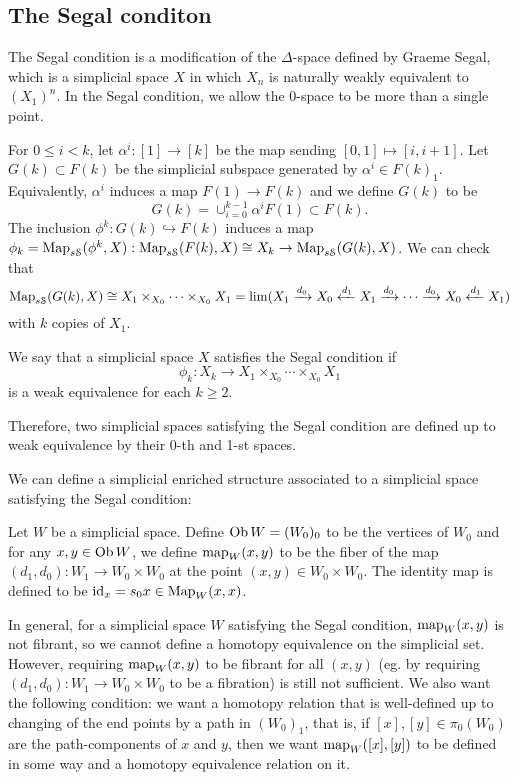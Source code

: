 \begin{refsection}
\subsection{The Segal conditon}
The Segal condition is a modification of the $\Delta$-space defined by Graeme Segal, which is a simplicial space $X$ in which $X_n$ is naturally weakly equivalent to $(X_1)^n$. In the Segal condition, we allow the $0$-space to be more than a single point.

For $0\le i<k$, let $\alpha^i:[1]\to [k]$ be the map sending $[0,1]\mapsto [i,i+1]$. Let $G(k)\subset F(k)$ be the simplicial subspace generated by $\alpha^i\in F(k)_1$. Equivalently, $\alpha^i$ induces a map $F(1)\to F(k)$ and we define $G(k)$ to be
$$G(k)=\cup_{i=0}^{k-1}\alpha^iF(1)\subset F(k).$$
The inclusion $\phi^k:G(k)\hookrightarrow F(k)$ induces a map $\phi_k=\operatorname{\mathrm{Map}}_{s\mathcal S}(\phi^k,X):\operatorname{\mathrm{Map}}_{s\mathcal S}(F(k),X)\cong X_k\to\operatorname{\mathrm{Map}}_{s\mathcal S}(G(k),X)$. We can check that
$$\operatorname{\mathrm{Map}}_{s\mathcal S}(G(k),X)\cong X_1\times_{X_0}\cdots\times_{X_0}X_1=\lim(X_1\xrightarrow{d_0}X_0\xleftarrow{d_1}X_1\xrightarrow{d_0}\cdots\xrightarrow{d_0}X_0\xleftarrow{d_1}X_1)$$
with $k$ copies of $X_1$.

\begin{defin}
We say that a simplicial space $X$ satisfies the Segal condition if
\begin{equation} \label{segal}
\phi_k:X_k\to X_1\times_{X_0}\cdots\times_{X_0}X_1
\end{equation}
is a weak equivalence for each $k\ge 2$.
\end{defin}

Therefore, two simplicial spaces satisfying the Segal condition are defined up to weak equivalence by their 0-th and 1-st spaces.

We can define a simplicial enriched structure associated to a simplicial space satisfying the Segal condition:
\begin{defin}\label{simpcat}
Let $W$ be a simplicial space. Define $\operatorname{Ob} W=(W_0)_0$ to be the vertices of $W_0$ and for any $x,y\in\operatorname{Ob} W$, we define $\operatorname{\mathrm{map}}_W(x,y)$ to be the fiber of the map $(d_1,d_0):W_1\to W_0\times W_0$ at the point $(x,y)\in W_0\times W_0$. The identity map is defined to be $\mathrm{id}_x=s_0x\in\operatorname{\mathrm{Map}}_W(x,x)$.
\end{defin}
In general, for a simplicial space $W$ satisfying the Segal condition, $\operatorname{\mathrm{map}}_W(x,y)$ is not fibrant, so we cannot define a homotopy equivalence on the simplicial set. However, requiring $\operatorname{\mathrm{map}}_W(x,y)$ to be fibrant for all $(x,y)$ (eg. by requiring $(d_1,d_0):W_1\to W_0\times W_0$ to be a fibration) is still not sufficient. We also want the following condition: we want a homotopy relation that is well-defined up to changing of the end points by a path in $(W_0)_1$, that is, if $[x],[y]\in\pi_0(W_0)$ are the path-components of $x$ and $y$, then we want $\operatorname{\mathrm{map}}_W([x],[y])$ to be defined in some way and a homotopy equivalence relation on it.


\end{refsection}
